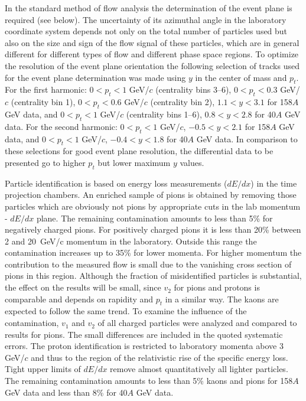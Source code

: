 \documentclass[aps,prc,superscriptaddress,showpacs,floatfix,nofootinbib]{revtex4}
\begin{document}
In the standard method of flow analysis the determination of the event
plane is required (see below). The uncertainty of its azimuthal angle
in the laboratory coordinate system depends not only on the total
number of particles used but also on the size and sign of the flow
signal of these particles, which are in general different for
different types of flow and different phase space regions. To optimize
the resolution of the event plane orientation the following selection
of tracks used for the event plane determination was made using $y$ in
the center of mass and $p_t$.  For the first harmonic: $0 < p_t < 1$
GeV/$c$ (centrality bins 3--6), $0 < p_t < 0.3$ GeV/$c$ (centrality
bin 1), $0 < p_t < 0.6$ GeV/$c$ (centrality bin 2), $ 1.1 < y < 3.1$
for 158$A$ GeV data, and $0 < p_t < 1$ GeV/$c$ (centrality bins 1--6),
$ 0.8 < y < 2.8$ for 40$A$ GeV data.  For the second harmonic: $0 <
p_t < 1$ GeV/$c$, $ -0.5 < y < 2.1$ for 158$A$ GeV data, and $0 < p_t
< 1$ GeV/$c$, $ -0.4 < y < 1.8$ for 40$A$ GeV data. In comparison to
these selections for good event plane resolution, the differential
data to be presented go to higher $p_t$ but lower maximum $y$ values.

Particle identification is based on energy loss measurements ($dE/dx$)
in the time projection chambers. An enriched sample of pions is
obtained by removing those particles which are obviously not pions by
appropriate cuts in the lab momentum - $dE/dx$ plane. The remaining
contamination amounts to less than 5\% for negatively charged
pions. For positively charged pions it is less than 20\% between 2 and
20~GeV/c momentum in the laboratory. Outside this range the
contamination increases up to 35\% for lower momenta. For higher
momentum the contribution to the measured flow is small due to the
vanishing cross section of pions in this region.  Although the
fraction of misidentified particles is substantial, the effect on the
results will be small, since $v_2$ for pions and protons is comparable
and depends on rapidity and $p_t$ in a similar way. The kaons are
expected to follow the same trend. To examine the influence of the
contamination, $v_1$ and $v_2$ of all charged particles were analyzed
and compared to results for pions. The small differences are included
in the quoted systematic errors.  The proton identification is
restricted to laboratory momenta above 3 GeV/$c$ and thus to the
region of the relativistic rise of the specific energy loss. Tight
upper limits of $dE/dx$ remove almost quantitatively all lighter
particles. The remaining contamination amounts to less than 5\% kaons
and pions for 158$A$ GeV data and less than 8\% for 40$A$ GeV data.
   
\end{document}
